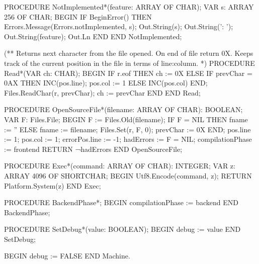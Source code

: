 \documentclass[utf8]{lgu}
\begin{document}
\begin{modula2long}
PROCEDURE NotImplemented*(feature: ARRAY OF CHAR);
VAR s: ARRAY 256 OF CHAR;
BEGIN
  IF BeginError() THEN
    Errors.Message(Errors.notImplemented, s);
    Out.String(s); Out.String(': ');
    Out.String(feature); Out.Ln
  END
END NotImplemented;

(** Returns next character from the file opened. On end of file return 0X.
    Keeps track of the current position in the file in terms of line:column. *)
PROCEDURE Read*(VAR ch: CHAR);
BEGIN
  IF r.eof THEN
    ch := 0X
  ELSE
    IF prevChar = 0AX THEN
      INC(pos.line);
      pos.col := 1
    ELSE
      INC(pos.col)
    END;
    Files.ReadChar(r, prevChar);
    ch := prevChar
  END
END Read;

PROCEDURE OpenSourceFile*(filename: ARRAY OF CHAR): BOOLEAN;
VAR F: Files.File;
BEGIN
  F := Files.Old(filename);
  IF F = NIL THEN
    fname := ''
  ELSE
    fname := filename;
    Files.Set(r, F, 0);
    prevChar := 0X
  END;
  pos.line := 1;
  pos.col := 1;
  errorPos.line := -1;
  hadErrors := F = NIL;
  compilationPhase := frontend
RETURN ¬hadErrors END OpenSourceFile;

PROCEDURE Exec*(command: ARRAY OF CHAR): INTEGER;
VAR z: ARRAY 4096 OF SHORTCHAR;
BEGIN
  Utf8.Encode(command, z);
RETURN  Platform.System(z) END Exec;

PROCEDURE BackendPhase*;
BEGIN
  compilationPhase := backend
END BackendPhase;

PROCEDURE SetDebug*(value: BOOLEAN);
BEGIN
  debug := value
END SetDebug;

BEGIN
  debug := FALSE
END Machine.
\end{modula2long}

\end{document}
